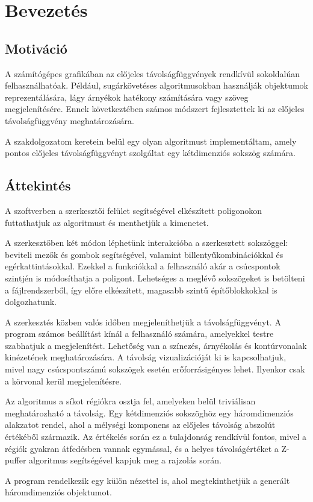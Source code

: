 \chapter{Bevezetés}
\label{ch:intro}

\section{Motiváció}\label{sec:motivacio}
A számítógépes grafikában az előjeles távolságfüggvények rendkívül sokoldalúan felhasználhatóak. Például, sugárkövetéses algoritmusokban használják objektumok reprezentálására, lágy árnyékok hatékony számítására vagy szöveg megjelenítésére. Ennek következtében számos módszert fejlesztettek ki az előjeles távolságfüggvény meghatározására.

A szakdolgozatom keretein belül egy olyan algoritmust implementáltam, amely pontos előjeles távolságfüggvényt szolgáltat egy kétdimenziós sokszög számára.

\section{Áttekintés}\label{sec:attekintes}
A szoftverben a szerkesztői felület segítségével elkészített poligonokon futtathatjuk az algoritmust és menthetjük a kimenetet.

A szerkesztőben két módon léphetünk interakcióba a szerkesztett sokszöggel: beviteli mezők és gombok segítségével, valamint billentyűkombinációkkal és egérkattintásokkal. Ezekkel a funkciókkal a felhasználó akár a csúcspontok szintjén is módosíthatja a poligont. Lehetséges a meglévő sokszögeket is betölteni a fájlrendszerből, így előre elkészített, magasabb szintű építőblokkokkal is dolgozhatunk.

A szerkesztés közben valós időben megjeleníthetjük a távolságfüggvényt. A program számos beállítást kínál a felhasználó számára, amelyekkel testre szabhatjuk a megjelenítést. Lehetőség van a színezés, árnyékolás és kontúrvonalak kinézetének meghatározására. A távolság vizualizációját ki is kapcsolhatjuk, mivel nagy csúcspontszámú sokszögek esetén erőforrásigényes lehet. Ilyenkor csak a körvonal kerül megjelenítésre.

Az algoritmus a síkot régiókra osztja fel, amelyeken belül triviálisan meghatározható a távolság. Egy kétdimenziós sokszöghöz egy háromdimenziós alakzatot rendel, ahol a mélységi komponens az előjeles távolság abszolút értékéből származik. Az értékelés során ez a tulajdonság rendkívül fontos, mivel a régiók gyakran átfedésben vannak egymással, és a helyes távolságértéket a Z-puffer algoritmus segítségével kapjuk meg a rajzolás során.

A program rendelkezik egy külön nézettel is, ahol megtekinthetjük a generált háromdimenziós objektumot.
